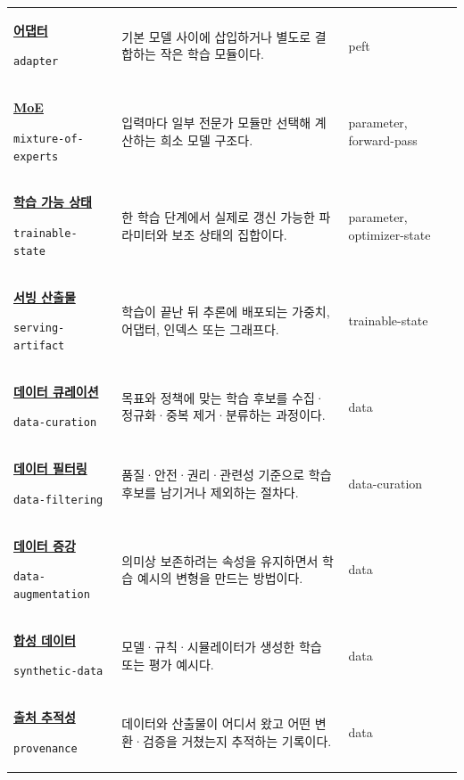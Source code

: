 \begin{longtable}{p{} p{} p{}}
\hypertarget{glossary:adapter}{\hyperref[bg:adapter]{\textbf{어댑터}}} \newline\texttt{adapter} & 기본 모델 사이에 삽입하거나 별도로 결합하는 작은 학습 모듈이다. & \scriptsize peft \\
\hypertarget{glossary:mixture-of-experts}{\hyperref[bg:mixture-of-experts]{\textbf{MoE}}} \newline\texttt{mixture-of-experts} & 입력마다 일부 전문가 모듈만 선택해 계산하는 희소 모델 구조다. & \scriptsize parameter, forward-pass \\
\hypertarget{glossary:trainable-state}{\hyperref[bg:trainable-state]{\textbf{학습 가능 상태}}} \newline\texttt{trainable-state} & 한 학습 단계에서 실제로 갱신 가능한 파라미터와 보조 상태의 집합이다. & \scriptsize parameter, optimizer-state \\
\hypertarget{glossary:serving-artifact}{\hyperref[bg:serving-artifact]{\textbf{서빙 산출물}}} \newline\texttt{serving-artifact} & 학습이 끝난 뒤 추론에 배포되는 가중치, 어댑터, 인덱스 또는 그래프다. & \scriptsize trainable-state \\
\hypertarget{glossary:data-curation}{\hyperref[bg:data-curation]{\textbf{데이터 큐레이션}}} \newline\texttt{data-curation} & 목표와 정책에 맞는 학습 후보를 수집·정규화·중복 제거·분류하는 과정이다. & \scriptsize data \\
\hypertarget{glossary:data-filtering}{\hyperref[bg:data-filtering]{\textbf{데이터 필터링}}} \newline\texttt{data-filtering} & 품질·안전·권리·관련성 기준으로 학습 후보를 남기거나 제외하는 절차다. & \scriptsize data-curation \\
\hypertarget{glossary:data-augmentation}{\hyperref[bg:data-augmentation]{\textbf{데이터 증강}}} \newline\texttt{data-augmentation} & 의미상 보존하려는 속성을 유지하면서 학습 예시의 변형을 만드는 방법이다. & \scriptsize data \\
\hypertarget{glossary:synthetic-data}{\hyperref[bg:synthetic-data]{\textbf{합성 데이터}}} \newline\texttt{synthetic-data} & 모델·규칙·시뮬레이터가 생성한 학습 또는 평가 예시다. & \scriptsize data \\
\hypertarget{glossary:provenance}{\hyperref[bg:provenance]{\textbf{출처 추적성}}} \newline\texttt{provenance} & 데이터와 산출물이 어디서 왔고 어떤 변환·검증을 거쳤는지 추적하는 기록이다. & \scriptsize data \\

\end{longtable}
